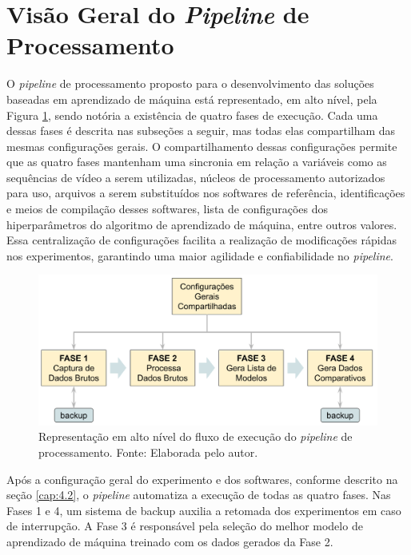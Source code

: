 \section{Visão Geral do \textit{Pipeline} de Processamento}
\label{cap:7.2}

O \textit{pipeline} de processamento proposto para o desenvolvimento das soluções baseadas em aprendizado de máquina está representado, em alto nível, pela Figura \ref{fig:25}, sendo notória a existência de quatro fases de execução. Cada uma dessas fases é descrita nas subseções a seguir, mas todas elas compartilham das mesmas configurações gerais. O compartilhamento dessas configurações permite que as quatro fases mantenham uma sincronia em relação a variáveis como as sequências de vídeo a serem utilizadas, núcleos de processamento autorizados para uso, arquivos a serem substituídos nos softwares de referência, identificações e meios de compilação desses softwares, lista de configurações dos hiperparâmetros do algoritmo de aprendizado de máquina, entre outros valores. Essa centralização de configurações facilita a realização de modificações rápidas nos experimentos, garantindo uma maior agilidade e confiabilidade no \textit{pipeline}.

\begin{figure}
    \centering
    \includegraphics[width=\textwidth]{FIGURES/fig_25.png}
    \caption{Representação em alto nível do fluxo de execução do \textit{pipeline} de processamento. Fonte: Elaborada pelo autor.}
    \label{fig:25}
\end{figure}

Após a configuração geral do experimento e dos softwares, conforme descrito na seção \ref{cap:4.2}, o \textit{pipeline} automatiza a execução de todas as quatro fases. Nas Fases 1 e 4, um sistema de backup auxilia a retomada dos experimentos em caso de interrupção. A Fase 3 é responsável pela seleção do melhor modelo de aprendizado de máquina treinado com os dados gerados da Fase 2.

